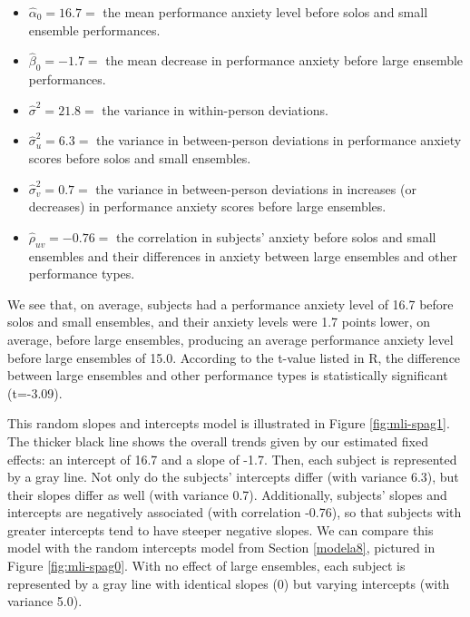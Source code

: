 \documentclass[
]{krantz}
\providecommand{\tightlist}{%
  \setlength{\itemsep}{0pt}\setlength{\parskip}{0pt}}
\begin{document}
\begin{itemize}
\tightlist
\item
  \(\hat{\alpha}_{0}=16.7=\) the mean performance anxiety level before solos and small ensemble performances.
\item
  \(\hat{\beta}_{0}=-1.7=\) the mean decrease in performance anxiety before large ensemble performances.
\item
  \(\hat{\sigma}^2=21.8=\) the variance in within-person deviations.
\item
  \(\hat{\sigma}_{u}^{2}=6.3=\) the variance in between-person deviations in performance anxiety scores before solos and small ensembles.
\item
  \(\hat{\sigma}_{v}^{2}=0.7=\) the variance in between-person deviations in increases (or decreases) in performance anxiety scores before large ensembles.
\item
  \(\hat{\rho}_{uv}=-0.76=\) the correlation in subjects' anxiety before solos and small ensembles and their differences in anxiety between large ensembles and other performance types.
\end{itemize}

We see that, on average, subjects had a performance anxiety level of 16.7 before solos and small ensembles, and their anxiety levels were 1.7 points lower, on average, before large ensembles, producing an average performance anxiety level before large ensembles of 15.0. According to the t-value listed in R, the difference between large ensembles and other performance types is statistically significant (t=-3.09).

This random slopes and intercepts model is illustrated in Figure \ref{fig:mli-spag1}. The thicker black line shows the overall trends given by our estimated fixed effects: an intercept of 16.7 and a slope of -1.7. Then, each subject is represented by a gray line. Not only do the subjects' intercepts differ (with variance 6.3), but their slopes differ as well (with variance 0.7). Additionally, subjects' slopes and intercepts are negatively associated (with correlation -0.76), so that subjects with greater intercepts tend to have steeper negative slopes. We can compare this model with the random intercepts model from Section \ref{modela8}, pictured in Figure \ref{fig:mli-spag0}. With no effect of large ensembles, each subject is represented by a gray line with identical slopes (0) but varying intercepts (with variance 5.0).
\end{document}
